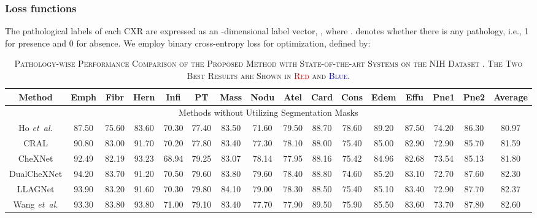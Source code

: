 \documentclass[journal]{IEEEtran}
\newcommand{\etal}{\emph{et~al.}}
\begin{document}
\subsubsection{\textbf{Loss functions}}
The pathological labels of each CXR are expressed as an -dimensional label vector, , where .  denotes whether there is any pathology, i.e., 1 for presence and 0 for absence. We employ binary cross-entropy loss for optimization, defined by:


\begin{table*}[!t]
    \centering
    \caption{\textsc{Pathology-wise Performance Comparison of the Proposed Method with State-of-the-art Systems on the NIH Dataset . The Two Best Results are Shown in \textcolor{red}{Red} and \textcolor{blue}{Blue}.}}
    \label{nih_comparison}
    \begin{adjustbox}{width=\textwidth}
    \begin{threeparttable}[b]
    \begin{tabular}{c|cccccccccccccc|c} 
    \hline
    \toprule 
    \bf Method & \bf Emph & \bf Fibr & \bf Hern & \bf Infi & \bf PT & \bf Mass & \bf Nodu & \bf Atel & \bf Card & \bf Cons & \bf Edem & \bf Effu & \bf Pne1 & \bf Pne2 & \bf Average \\
    \hline\hline
    \multicolumn{16}{c}{Methods without Utilizing Segmentation Masks} \\
    \hline
    Ho \etal \cite{ho2019multiple} & 87.50 & 75.60 & 83.60 & 70.30 & 77.40 & 83.50 & 71.60 & 79.50 & 88.70 & 78.60 & 89.20 & 87.50 & 74.20 & 86.30 & 80.97 \\
    CRAL \cite{GUAN2020259} & 90.80 & 83.00 & 91.70 & 70.20 & 77.80 & 83.40 & 77.30 & 78.10 & 88.00 & 75.40 & 85.00 & 82.90 & 72.90 & 85.70 & 81.59 \\
    CheXNet \cite{Rajpurkar2017CheXNetRP} & 92.49 & 82.19 & 93.23 & 68.94 & 79.25 & 83.07 & 78.14 & 77.95 & 88.16 & 75.42 & 84.96 & 82.68 & 73.54 & 85.13 & 81.80 \\
    DualCheXNet \cite{chen2019dualchexnet} & 94.20 & 83.70 & 91.20 & 70.50 & 79.60 & 83.80 & 79.60 & 78.40 & 88.80 & 74.60 & 85.20 & 83.10 & 72.70 & 87.60 & 82.30 \\
    LLAGNet \cite{Chen2020LesionLA} & 93.90 & 83.20 & 91.60 & 70.30 & 79.80 & 84.10 & 79.00 & 78.30 & 88.50 & 75.40 & 85.10 & 83.40 & 72.90 & 87.70 & 82.37 \\
    Wang \etal \cite{wang2020triple} & 93.30 & 83.80 & 93.80 & 71.00 & 79.10 & 83.40 & 77.70 & 77.90 & 89.50 & 75.90 & 85.50 & 83.60 & 73.70 & 87.80 & 82.60 \\

\end{tabular}
\end{threeparttable}
\end{adjustbox}
\end{table*}
\end{document}
